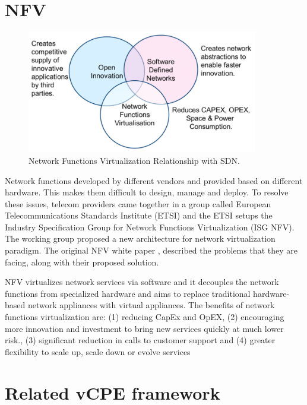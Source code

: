 \section{NFV} \label{sec:nfv}

\begin{figure}[!ht]
\centering
\includegraphics[width=0.9\textwidth]{./fig/nfv_and_sdn.png}
\caption{Network Functions Virtualization Relationship with SDN. \cite{nfv-wp}}
\label{fig:nfv_and_sdn}
\end{figure}

Network functions developed by different vendors and provided based on different hardware. This makes them difficult to design, manage and deploy.
To resolve these issues, telecom providers came together in a group called European Telecommunications Standards Institute (ETSI) and the ETSI setups the Industry Specification Group for Network Functions Virtualization (ISG NFV). The working group proposed a new architecture for network virtualization paradigm. The original NFV white paper \cite{nfv-wp}, described the problems that they are facing, along with their proposed solution.

NFV virtualizes network services via software and it decouples the network functions from specialized hardware and aims to replace traditional hardware-based network appliances with virtual appliances.
The benefits of network functions virtualization are: (1) reducing CapEx and OpEX, (2) encouraging more innovation and investment to bring new services quickly at much lower risk., (3) significant reduction in calls to customer support and (4) greater flexibility to scale up, scale down or evolve services





\section{Related vCPE framework} \label{sec:related_vcpe}

